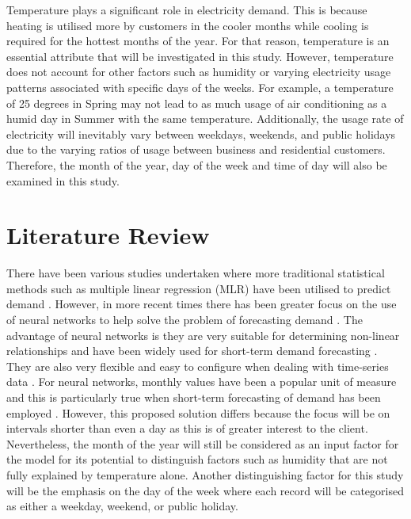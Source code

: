 \documentclass[mstat,12pt]{unswthesis}
\begin{document}
\bigskip

Temperature plays a significant role in electricity demand. This is
because heating is utilised more by customers in the cooler months while
cooling is required for the hottest months of the year. For that reason,
temperature is an essential attribute that will be investigated in this
study. However, temperature does not account for other factors such as
humidity or varying electricity usage patterns associated with specific
days of the weeks. For example, a temperature of 25 degrees in Spring
may not lead to as much usage of air conditioning as a humid day in
Summer with the same temperature. Additionally, the usage rate of
electricity will inevitably vary between weekdays, weekends, and public
holidays due to the varying ratios of usage between business and
residential customers. Therefore, the month of the year, day of the week
and time of day will also be examined in this study.

\hypertarget{literature-review}{%
\chapter{Literature Review}\label{literature-review}}

There have been various studies undertaken where more traditional
statistical methods such as multiple linear regression (MLR) have been
utilised to predict demand \cite{Mohamed2005}. However, in more recent
times there has been greater focus on the use of neural networks to help
solve the problem of forecasting demand \cite{Gonzalez2008}. The
advantage of neural networks is they are very suitable for determining
non-linear relationships \cite{Gonzalez2008} and have been widely used
for short-term demand forecasting \cite{Ciulla2019}. They are also very
flexible and easy to configure when dealing with time-series data
\cite{Carmona2002}. For neural networks, monthly values have been a
popular unit of measure and this is particularly true when short-term
forecasting of demand has been employed \cite{Carmona2002}. However,
this proposed solution differs because the focus will be on intervals
shorter than even a day as this is of greater interest to the client.
Nevertheless, the month of the year will still be considered as an input
factor for the model for its potential to distinguish factors such as
humidity that are not fully explained by temperature alone. Another
distinguishing factor for this study will be the emphasis on the day of
the week where each record will be categorised as either a weekday,
weekend, or public holiday.
\end{document}
